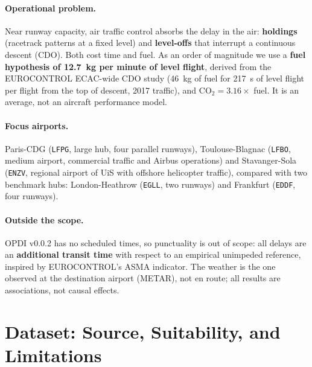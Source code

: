 \documentclass[11pt,a4paper]{article}
\begin{document}
\paragraph{Operational problem.}
Near runway capacity, air traffic control absorbs the delay in the air: \textbf{holdings} (racetrack patterns at a fixed level) and \textbf{level-offs} that interrupt a continuous descent (CDO). Both cost time and fuel. As an order of magnitude we use a \textbf{fuel hypothesis of 12.7~kg per minute of level flight}, derived from the EUROCONTROL ECAC-wide CDO study (46~kg of fuel for 217~s of level flight per flight from the top of descent, 2017 traffic), and $\text{CO}_2 = 3.16 \times$ fuel. It is an average, not an aircraft performance model.

\paragraph{Focus airports.}
Paris-CDG (\texttt{LFPG}, large hub, four parallel runways), Toulouse-Blagnac (\texttt{LFBO}, medium airport, commercial traffic and Airbus operations) and Stavanger-Sola (\texttt{ENZV}, regional airport of UiS with offshore helicopter traffic), compared with two benchmark hubs: London-Heathrow (\texttt{EGLL}, two runways) and Frankfurt (\texttt{EDDF}, four runways).

\paragraph{Outside the scope.}
OPDI v0.0.2 has no scheduled times, so punctuality is out of scope: all delays are an \textbf{additional transit time} with respect to an empirical unimpeded reference, inspired by EUROCONTROL's ASMA indicator. The weather is the one observed at the destination airport (METAR), not en route; all results are associations, not causal effects.

\section{Dataset: Source, Suitability, and Limitations}
\end{document}
